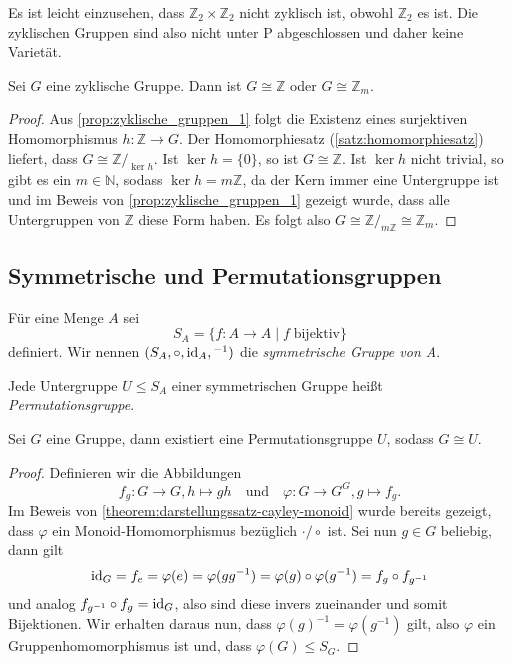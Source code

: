 \begin{remark}
    Es ist leicht einzusehen, dass $\mathbb{Z}_2 \times \mathbb{Z}_2$ nicht zyklisch ist, obwohl $\mathbb{Z}_2$ es ist. Die zyklischen Gruppen sind also nicht unter P abgeschlossen und daher keine Varietät.
\end{remark}

\begin{proposition}
    Sei $G$ eine zyklische Gruppe. Dann ist $G \cong \mathbb{Z}$ oder $G \cong \mathbb{Z}_m$.
\end{proposition}
\begin{proof}
    Aus \cref{prop:zyklische_gruppen_1} folgt die Existenz eines surjektiven Homomorphismus $h: \mathbb{Z} \to G$. Der Homomorphiesatz (\ref{satz:homomorphiesatz}) liefert, dass $G \cong \mathbb{Z}/_{\ker h}$. Ist $\ker h = \{0\}$, so ist $G \cong \mathbb{Z}$. Ist $\ker h$ nicht trivial, so gibt es ein $m \in \mathbb{N}$, sodass $\ker h = m\mathbb{Z}$, da der Kern immer eine Untergruppe ist und im Beweis von \cref{prop:zyklische_gruppen_1} gezeigt wurde, dass alle Untergruppen von $\mathbb{Z}$ diese Form haben. Es folgt also $G \cong \mathbb{Z}/_{m\mathbb{Z}} \cong \mathbb{Z}_m$.
\end{proof}

\subsection{Symmetrische und Permutationsgruppen}

\begin{definition}
    Für eine Menge $A$ sei
    $$ S_A = \{f: A \to A \mid f \;\text{bijektiv}\}$$
    definiert. Wir nennen $(S_A, \circ, \operatorname{id}_A, {}^{-1})$ die \emph{symmetrische Gruppe von A}.

    Jede Untergruppe $U \le S_A$ einer symmetrischen Gruppe heißt \emph{Permutationsgruppe}.
\end{definition}

\begin{theorem}\label{satz:darstellungssatz-cayley-gruppen}
    Sei $G$ eine Gruppe, dann existiert eine Permutationsgruppe $U$, sodass $G \cong U$.
\end{theorem}
\begin{proof}
    Definieren wir die Abbildungen $$f_g: G \to G, h \mapsto gh \quad\text{und}\quad \varphi: G \to G^G, g \mapsto f_g.$$
    Im Beweis von \cref{theorem:darstellungssatz-cayley-monoid} wurde bereits gezeigt, dass $\varphi$ ein Monoid-Homomorphismus bezüglich $\cdot / \circ$ ist. Sei nun $g \in G$ beliebig, dann gilt $$ \operatorname{id}_G = f_e = \varphi(e) = \varphi(g g^{-1}) = \varphi(g) \circ \varphi(g^{-1}) = f_g \circ f_{g^{-1}}$$
    und analog $f_{g^{-1}} \circ f_g = \operatorname{id}_G$, also sind diese invers zueinander und somit Bijektionen. Wir erhalten daraus nun, dass $\varphi(g)^{-1} = \varphi(g^{-1})$ gilt, also $\varphi$ ein Gruppenhomomorphismus ist und, dass $\varphi(G) \le S_G$.
\end{proof}

